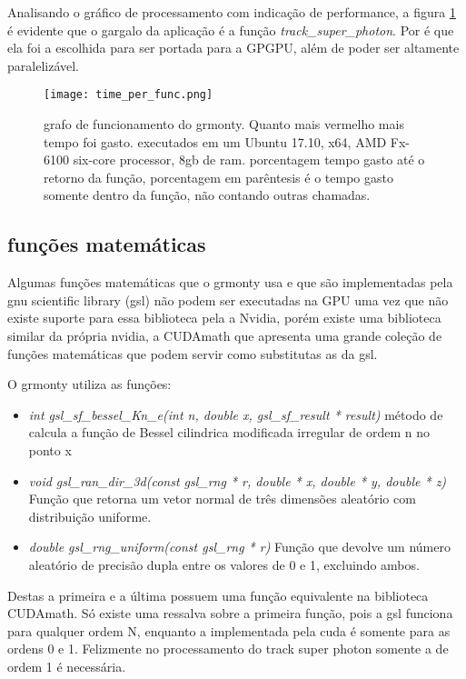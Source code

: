     Analisando o gráfico de processamento com indicação de performance, a figura \ref{fig:grmonty-performance} é evidente que o gargalo da aplicação é a função \textit{track\_super\_photon}. Por é que ela foi a escolhida para ser portada para a GPGPU, além de poder ser altamente paralelizável.

    \begin{figure}[!h]
      \centering
      \texttt{[image: time\_per\_func.png]}
      \caption{grafo de funcionamento do grmonty. Quanto mais vermelho mais tempo foi gasto. executados em um Ubuntu 17.10, x64, AMD Fx-6100 six-core processor, 8gb de ram. porcentagem tempo gasto até o retorno da função, porcentagem em parêntesis é o tempo gasto somente dentro da função, não contando outras chamadas.}
      \label{fig:grmonty-performance}
    \end{figure}

  \subsection{funções matemáticas}
    Algumas funções matemáticas que o grmonty usa e que são implementadas pela gnu scientific library (gsl) não podem ser executadas na GPU uma vez que não existe suporte para essa biblioteca pela a Nvidia, porém existe uma biblioteca similar da própria nvidia, a CUDAmath que apresenta uma grande coleção de funções matemáticas que podem servir como substitutas as da gsl.

    O grmonty utiliza as funções:
    \begin{itemize}
      \item \textit{int gsl\_sf\_bessel\_Kn\_e(int n, double x, gsl\_sf\_result * result)} método de calcula a função de Bessel cilindrica modificada irregular de ordem n no ponto x
      \item \textit{void gsl\_ran\_dir\_3d(const gsl\_rng * r, double * x, double * y, double * z)} Função que retorna um vetor normal de três dimensões aleatório com distribuição uniforme.
      \item \textit{double gsl\_rng\_uniform(const gsl\_rng * r)} Função que devolve um número aleatório de precisão dupla entre os valores de 0 e 1, excluindo ambos.
    \end{itemize}

    Destas a primeira e a última possuem uma função equivalente na biblioteca CUDAmath. Só existe uma ressalva sobre a primeira função, pois a gsl funciona para qualquer ordem N, enquanto a implementada pela cuda é somente para as ordens 0 e 1. Felizmente no processamento do track super photon somente a de ordem 1 é necessária.

